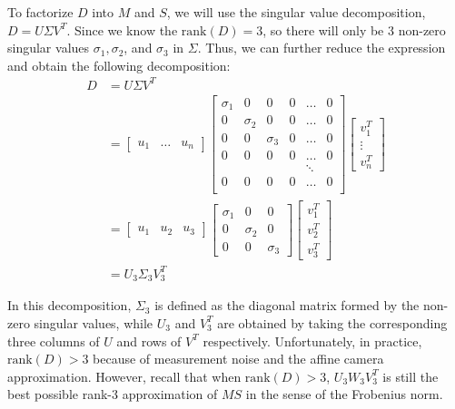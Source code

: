 \documentclass[a4paper, 12pt]{article}
\numberwithin{equation}{section}
\begin{document}
To factorize $D$ into $M$ and $S$, we will use the singular value decomposition, $D = U \Sigma V^T$. Since we know the $\mathrm{rank}(D) = 3$, so there will only be 3 non-zero singular values $\sigma_1 , \sigma_2$, and $\sigma_3$ in $\Sigma$. Thus, we can further reduce the expression and obtain the following decomposition:
\begin{equation}
    \begin{split}
        D &= U \Sigma V^T\\ 
        &= \begin{bmatrix} u_1 & \hdots & u_n \end{bmatrix} 
        \begin{bmatrix}
            \sigma_1 & 0 & 0 & 0 & \hdots & 0\\
            0 & \sigma_2 & 0 & 0 & \hdots & 0\\ 
            0 & 0 & \sigma_3 & 0 & \hdots & 0\\ 
            0 & 0 & 0 & 0 & \hdots & 0\\ 
             &  &  & & \ddots & \\ 
            0 & 0 & 0 & 0 & \hdots & 0\\ 
        \end{bmatrix}
        \begin{bmatrix} v_1^T \\ \vdots \\ v_n^T \end{bmatrix}\\
        & = \begin{bmatrix} u_1 & u_2 & u_3 \end{bmatrix} 
        \begin{bmatrix}
            \sigma_1 & 0 & 0\\
            0 & \sigma_2 & 0\\ 
            0 & 0 & \sigma_3
        \end{bmatrix}
        \begin{bmatrix} v_1^T \\ v_2^T \\ v_3^T \end{bmatrix}\\
        & = U_3 \Sigma_3 V^T_3
    \end{split}
    \label{eq:svd_factorization}
\end{equation}

In this decomposition, $\Sigma_3$ is defined as the diagonal matrix formed by the non-zero singular values, while $U_3$ and $V^T_3$ are obtained by taking the corresponding three columns of $U$ and rows of $V^T$ respectively. Unfortunately, in practice, $\mathrm{rank}(D) > 3$ because of measurement noise and the affine camera approximation. However, recall that when $\mathrm{rank}(D) > 3$, $U_3 W_3 V_3^T$ is still the best possible rank-3 approximation of $MS$ in the sense of the Frobenius norm. 
\end{document}
